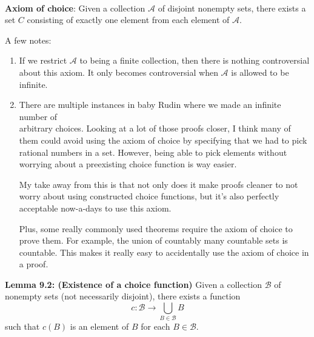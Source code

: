 \documentclass{book}
\newcommand{\myComment}{%
   \color{RawerSienna}%
   \fontsize{12}{14}\selectfont%
}
\newenvironment{myIndent}{%
   \begin{adjustwidth}{2.5em}{0em}%
}{%
   \end{adjustwidth}%
}
\newcommand{\blab}[1]{\textbf{#1}}
\newcommand{\mySepTwo}[1][.]{%
   {\noindent\color{#1}{\rule{6.5in}{0.5mm}}}\\%
}
\newcommand{\retTwo}{\hfill\bigbreak}
\begin{document}
   \mySepTwo

   \blab{Axiom of choice}: Given a collection $\mathcal{A}$ of disjoint nonempty sets, there exists a set $C$ consisting of exactly one element from each element of $\mathcal{A}$.

   
   \begin{myIndent}\myComment
      A few notes:
      \begin{enumerate}
         \item If we restrict $\mathcal{A}$ to being a finite collection, then there is nothing controversial about this axiom. It only becomes controversial when $\mathcal{A}$ is allowed to be infinite.
         \item There are multiple instances in baby Rudin where we made an infinite number of\\ arbitrary choices. Looking at a lot of those proofs closer, I think many of them could avoid using the axiom of choice by specifying that we had to pick rational numbers in a set. However, being able to pick elements without worrying about a preexisting choice function is way easier.\retTwo
         
         My take away from this is that not only does it make proofs cleaner to not worry about using constructed choice functions, but it's also perfectly acceptable now-a-days to use this axiom.\newpage
         
         Plus, some really commonly used theorems require the axiom of choice to prove them. For example, the union of countably many countable sets is countable. This makes it really easy to accidentally use the axiom of choice in a proof.\retTwo
      \end{enumerate}
   \end{myIndent}

   \blab{Lemma 9.2: (Existence of a choice function)} Given a collection $\mathcal{B}$ of nonempty sets (not necessarily disjoint), there exists a function \[c: \mathcal{B} \longrightarrow \bigcup\limits_{B \in \mathcal{B}}B\] such that $c(B)$ is an element of $B$ for each $B \in \mathcal{B}$.\retTwo
\end{document}
